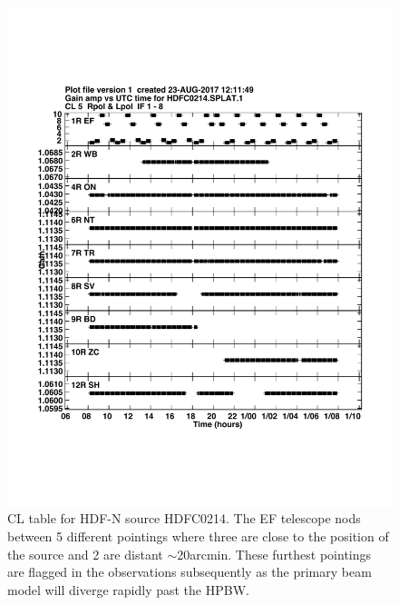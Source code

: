 \documentclass[idxtotoc,hyperref,openany]{article} %
\begin{document}
\begin{figure}[H] %
\begin{center}
\includegraphics[page=1,width=\linewidth]{PBcor_CL_table.pdf}
\end{center}
\caption{CL table for HDF-N source HDFC0214. The EF telescope nods between 5 different pointings where three are close to the position of the source and 2 are distant $\sim$20arcmin. These furthest pointings are flagged in the observations subsequently as the primary beam model will diverge rapidly past the HPBW.}
\label{fig:example_figure}
\end{figure}
\end{document}

